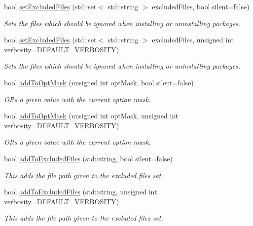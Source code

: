 \begin{DoxyCompactItemize}
bool \mbox{\hyperlink{classOptions_a6a3e6714e36c0b92acc6bb26e8d0a340}{set\+Excluded\+Files}} (std\+::set$<$ std\+::string $>$ excluded\+Files, bool silent=false)
\begin{DoxyCompactList}\small\item\em Sets the files which should be ignored when installing or uninstalling packages. \end{DoxyCompactList}\item 
bool \mbox{\hyperlink{classOptions_ae98c81f1bbace97cdf753c93dddac9c6}{set\+Excluded\+Files}} (std\+::set$<$ std\+::string $>$ excluded\+Files, unsigned int verbosity=D\+E\+F\+A\+U\+L\+T\+\_\+\+V\+E\+R\+B\+O\+S\+I\+TY)
\begin{DoxyCompactList}\small\item\em Sets the files which should be ignored when installing or uninstalling packages. \end{DoxyCompactList}\item 
bool \mbox{\hyperlink{classOptions_ae84bbfbd999a4fddbbb0c549189f07dd}{add\+To\+Opt\+Mask}} (unsigned int opt\+Mask, bool silent=false)
\begin{DoxyCompactList}\small\item\em OR\textquotesingle{}s a given value with the current option mask. \end{DoxyCompactList}\item 
bool \mbox{\hyperlink{classOptions_a01faf2a904ab468235b64d58ef334349}{add\+To\+Opt\+Mask}} (unsigned int opt\+Mask, unsigned int verbosity=D\+E\+F\+A\+U\+L\+T\+\_\+\+V\+E\+R\+B\+O\+S\+I\+TY)
\begin{DoxyCompactList}\small\item\em OR\textquotesingle{}s a given value with the current option mask. \end{DoxyCompactList}\item 
bool \mbox{\hyperlink{classOptions_a3c3e79d8f56897aa0bbf7cd024b1b2b2}{add\+To\+Excluded\+Files}} (std\+::string, bool silent=false)
\begin{DoxyCompactList}\small\item\em This adds the file path given to the excluded files set. \end{DoxyCompactList}\item 
bool \mbox{\hyperlink{classOptions_a9246884cfd991132e0d9be8c13146b54}{add\+To\+Excluded\+Files}} (std\+::string, unsigned int verbosity=D\+E\+F\+A\+U\+L\+T\+\_\+\+V\+E\+R\+B\+O\+S\+I\+TY)
\begin{DoxyCompactList}\small\item\em This adds the file path given to the excluded files set. \end{DoxyCompactList}\item 

\end{DoxyCompactItemize}
